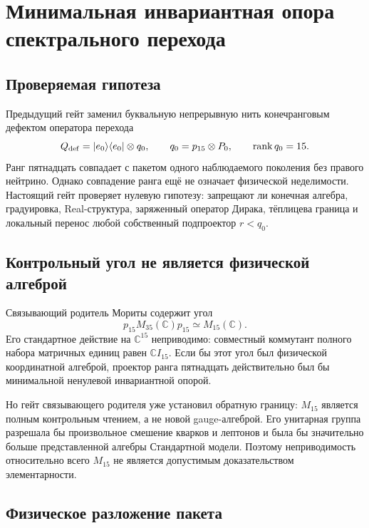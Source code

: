 \chapter{Минимальная инвариантная опора спектрального перехода}
\label{ch:v6-spectral-transition-minimal-support-gate}

\section{Проверяемая гипотеза}

Предыдущий гейт заменил буквальную непрерывную нить конечранговым дефектом
оператора перехода
\begin{equation}
 Q_{\mathrm{def}}=|e_0\rangle\langle e_0|\otimes q_0,
 \qquad
 q_0=p_{15}\otimes P_0,
 \qquad
 \operatorname{rank} q_0=15.
\end{equation}
Ранг пятнадцать совпадает с пакетом одного наблюдаемого поколения без
правого нейтрино. Однако совпадение ранга ещё не означает физической
неделимости. Настоящий гейт проверяет нулевую гипотезу: запрещают ли
конечная алгебра, градуировка, Real-структура, заряженный оператор Дирака,
тёплицева граница и локальный перенос любой собственный подпроектор
$r<q_0$.

\section{Контрольный угол не является физической алгеброй}

Связывающий родитель Мориты содержит угол
\begin{equation}
 p_{15}M_{35}(\mathbb C)p_{15}\simeq M_{15}(\mathbb C).
\end{equation}
Его стандартное действие на $\mathbb C^{15}$ неприводимо: совместный
коммутант полного набора матричных единиц равен $\mathbb C I_{15}$.
Если бы этот угол был физической координатной алгеброй, проектор ранга
пятнадцать действительно был бы минимальной ненулевой инвариантной опорой.

Но гейт связывающего родителя уже установил обратную границу: $M_{15}$
является полным контрольным чтением, а не новой gauge-алгеброй. Его
унитарная группа разрешала бы произвольное смешение кварков и лептонов и
была бы значительно больше представленной алгебры Стандартной модели.
Поэтому неприводимость относительно всего $M_{15}$ не является допустимым
доказательством элементарности.

\section{Физическое разложение пакета}

